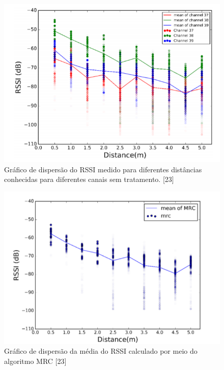\begin{figure}[H]
    \centering 
    \includegraphics[scale = 1]{images/rssi_channels_raw.png}
    \caption{Gráfico de dispersão do RSSI medido para diferentes distâncias conhecidas para diferentes canais sem tratamento.  [23] }
    \label{fig:rssi_channels_raw.png}
\end{figure}

\begin{figure}[H]
    \centering 
    \includegraphics[scale = 1]{images/rssi_channels_mrc.png}
    \caption{Gráfico de dispersão da média do RSSI calculado por meio do algoritmo MRC [23]}
    \label{fig:rssi_channels_mrc.png}
\end{figure}



